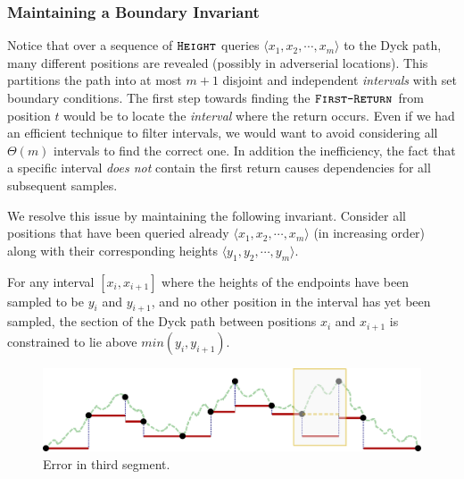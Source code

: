 \subsubsection{Maintaining a Boundary Invariant}%
\label{sec:maintaining_a_boundary_invariant}
Notice that over a sequence of $\texttt{\textsc{Height}}$ queries $\langle x_1, x_2,\cdots, x_m \rangle$ to the Dyck path,
many different positions are revealed (possibly in adverserial locations).
This partitions the path into at most $m+1$ disjoint and independent \emph{intervals} with set boundary conditions.
The first step towards finding the $\texttt{\textsc{First-Return}}$ from position $t$ would be to locate the \emph{interval} where the return occurs.
Even if we had an efficient technique to filter intervals, we would want to avoid considering all $\Theta(m)$ intervals to find the correct one.
In addition the inefficiency, the fact that a specific interval \emph{does not} contain the first return causes dependencies for all subsequent samples.

We resolve this issue by maintaining the following invariant.
Consider all positions that have been queried already $ \langle x_1, x_2,\cdots, x_m \rangle$ (in increasing order)
along with their corresponding heights $ \langle y_1, y_2,\cdots, y_m \rangle$.
\begin{invariant}
\label{inv:boundary_invariant}
For any interval $[x_i,x_{i+1}]$ where the heights  of the endpoints have been sampled to be $y_i$ and $y_{i+1}$,
and no other position in the interval has yet been sampled,
the section of the Dyck path between positions $x_i$ and $x_{i+1}$ is constrained to lie above $min(y_i, y_{i+1})$.
\end{invariant}
\begin{figure}[htpb]
    \centering
    \includegraphics[width=\textwidth]{images/dyck_boundary_invariant.pdf}
    \caption{Error in third segment.}
    \label{fig:dyck_boundary_invariant}
\end{figure}


